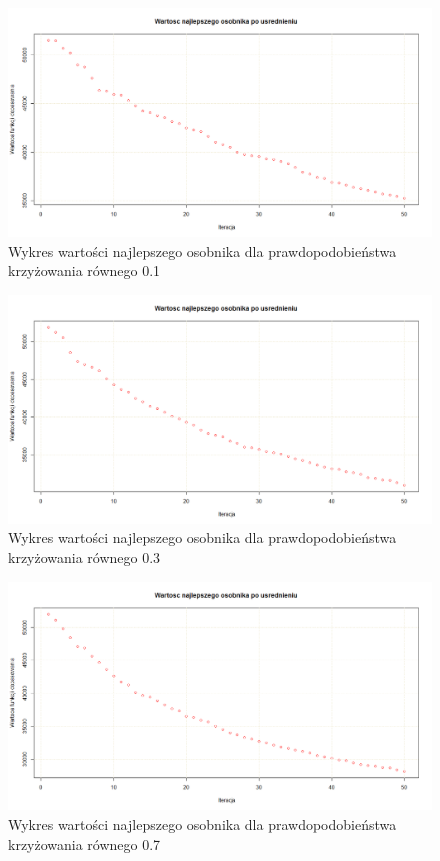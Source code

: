 \begin{figure}[H]
\centering

\includegraphics[scale=0.3]{IO_obrazy/US50_krz_01}
\caption{Wykres wartości najlepszego osobnika dla prawdopodobieństwa krzyżowania równego 0.1}
\end{figure}

\begin{figure}[H]
\centering

\includegraphics[scale=0.3]{IO_obrazy/US50_krz_03}
\caption{Wykres wartości najlepszego osobnika dla prawdopodobieństwa krzyżowania równego 0.3}
\end{figure}

\begin{figure}[H]
\centering

\includegraphics[scale=0.3]{IO_obrazy/US50_krz_07}
\caption{Wykres wartości najlepszego osobnika dla prawdopodobieństwa krzyżowania równego 0.7}
\end{figure}


